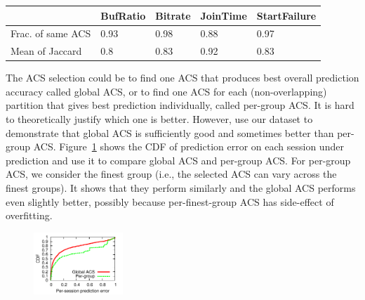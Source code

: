 
\begin{table}[t]
\begin{center}
\begin{small}
\begin{tabular}{p{2.2cm}|p{1.1cm}|p{1.1cm}|p{1.1cm}|p{1.1cm}}
		& BufRatio & Bitrate & JoinTime & StartFailure\\ \hline 
Frac. of same ACS & 0.93 & 0.98 & 0.88 & 0.97 \\
Mean of Jaccard & 0.8 & 0.83 & 0.92 & 0.83 \\
\end{tabular}
\end{small}
\end{center}
\label{tab:greedy-exhaustive}
\end{table}

 The ACS selection could be to find one ACS that produces best overall prediction accuracy called global ACS, or to find one ACS for each (non-overlapping) partition that gives best prediction individually, called per-group ACS. It is hard to theoretically justify which one is better. However, use our dataset to demonstrate that global ACS is sufficiently good and sometimes better than per-group ACS.
Figure~\ref{fig:global-acs} shows the CDF of prediction error on each session under prediction and use it to compare global ACS and per-group ACS. For per-group ACS, we consider the finest group (i.e., the selected ACS can vary across the finest groups). It shows that they perform similarly and the global ACS performs even slightly better, possibly because per-finest-group ACS has side-effect of overfitting.

\begin{figure}[h!]
\centering
 \includegraphics[width=0.3\textwidth] {figures/newfig/example-granular-metric0-new.pdf}
\label{fig:global-acs}
\end{figure}


